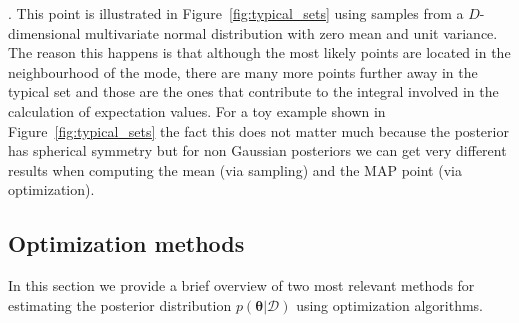 \documentclass[12pt,dvipsnames]{report}
\renewcommand{\vec}[1]{\boldsymbol{\mathbf{#1}}}
\begin{document}
\citep[for a good overview of this issue see][]{arXiv:1701.02434}.
This point is illustrated in Figure~\ref{fig:typical_sets} using samples from 
a $D$-dimensional multivariate normal distribution with zero mean and unit 
variance. 
The reason this happens is that  although the most likely points are located 
in the neighbourhood of the mode, 
there are many more points further away in the typical set and those are the 
ones that contribute to the integral involved in the calculation of expectation 
values.
For a toy example shown in Figure~\ref{fig:typical_sets} the fact this does not 
matter much because the posterior has spherical symmetry but  for non Gaussian
posteriors we can get very different results  when computing the mean (via 
sampling) and the MAP point (via optimization).


\subsection{Optimization methods}
In this section we provide a brief overview of two most relevant methods for
estimating the posterior distribution $p(\vec{\theta}\lvert \mathcal{D})$ using
optimization algorithms.
\end{document}
